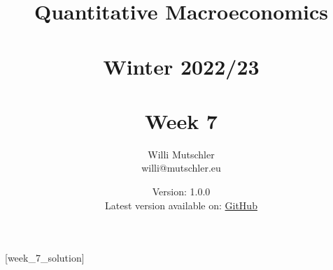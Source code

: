 
\newif\ifDisplaySolutions%


\title{Quantitative Macroeconomics\\~\\Winter 2022/23\\~\\Week 7}
\author{Willi Mutschler\\willi@mutschler.eu}
\date{Version: 1.0.0\\Latest version available on: \href{https://github.com/wmutschl/Quantitative-Macroeconomics/releases/latest/download/week_7.pdf}{GitHub}}
\maketitle\thispagestyle{empty}

\newpage
{}[week_7_solution]
\tableofcontents\thispagestyle{empty}\newpage

\setcounter{page}{1}
\newpage
\newpage
\newpage
\printbibliography
\newpage

\ifDisplaySolutions
\newpage
\appendix
\section{Solutions}

\fi

